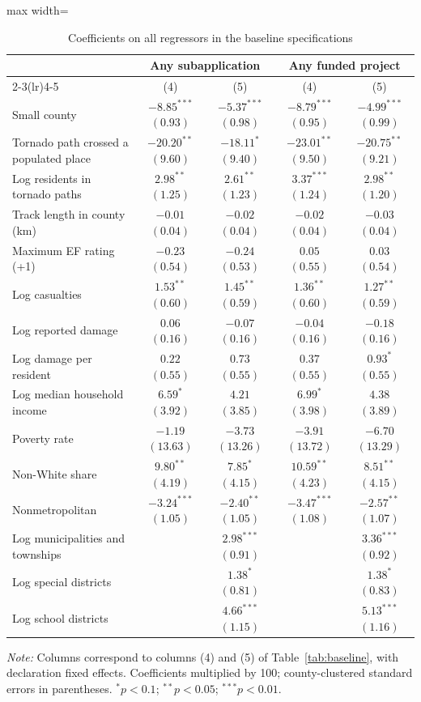\begin{table}[!htbp]
\centering
\caption{Coefficients on all regressors in the baseline specifications}
\label{tab:controls}
\scriptsize
\begin{adjustbox}{max width=\linewidth}
\begin{tabular}{@{}lcccc@{}}
\toprule
 & \multicolumn{2}{c}{Any subapplication} & \multicolumn{2}{c}{Any funded project} \\
\cmidrule(lr){2-3}\cmidrule(lr){4-5}
 & (4) & (5) & (4) & (5) \\
\midrule
Small county & $-8.85^{***}$ $(0.93)$ & $-5.37^{***}$ $(0.98)$ & $-8.79^{***}$ $(0.95)$ & $-4.99^{***}$ $(0.99)$ \\
Tornado path crossed a populated place & $-20.20^{**}$ $(9.60)$ & $-18.11^{*}$ $(9.40)$ & $-23.01^{**}$ $(9.50)$ & $-20.75^{**}$ $(9.21)$ \\
Log residents in tornado paths & $2.98^{**}$ $(1.25)$ & $2.61^{**}$ $(1.23)$ & $3.37^{***}$ $(1.24)$ & $2.98^{**}$ $(1.20)$ \\
Track length in county (km) & $-0.01$ $(0.04)$ & $-0.02$ $(0.04)$ & $-0.02$ $(0.04)$ & $-0.03$ $(0.04)$ \\
Maximum EF rating (+1) & $-0.23$ $(0.54)$ & $-0.24$ $(0.53)$ & $0.05$ $(0.55)$ & $0.03$ $(0.54)$ \\
Log casualties & $1.53^{**}$ $(0.60)$ & $1.45^{**}$ $(0.59)$ & $1.36^{**}$ $(0.60)$ & $1.27^{**}$ $(0.59)$ \\
Log reported damage & $0.06$ $(0.16)$ & $-0.07$ $(0.16)$ & $-0.04$ $(0.16)$ & $-0.18$ $(0.16)$ \\
Log damage per resident & $0.22$ $(0.55)$ & $0.73$ $(0.55)$ & $0.37$ $(0.55)$ & $0.93^{*}$ $(0.55)$ \\
Log median household income & $6.59^{*}$ $(3.92)$ & $4.21$ $(3.85)$ & $6.99^{*}$ $(3.98)$ & $4.38$ $(3.89)$ \\
Poverty rate & $-1.19$ $(13.63)$ & $-3.73$ $(13.26)$ & $-3.91$ $(13.72)$ & $-6.70$ $(13.29)$ \\
Non-White share & $9.80^{**}$ $(4.19)$ & $7.85^{*}$ $(4.15)$ & $10.59^{**}$ $(4.23)$ & $8.51^{**}$ $(4.15)$ \\
Nonmetropolitan & $-3.24^{***}$ $(1.05)$ & $-2.40^{**}$ $(1.05)$ & $-3.47^{***}$ $(1.08)$ & $-2.57^{**}$ $(1.07)$ \\
Log municipalities and townships &  & $2.98^{***}$ $(0.91)$ &  & $3.36^{***}$ $(0.92)$ \\
Log special districts &  & $1.38^{*}$ $(0.81)$ &  & $1.38^{*}$ $(0.83)$ \\
Log school districts &  & $4.66^{***}$ $(1.15)$ &  & $5.13^{***}$ $(1.16)$ \\
\bottomrule
\end{tabular}
\end{adjustbox}
\begin{minipage}{0.9\linewidth}\vspace{4pt}\scriptsize
\textit{Note:} Columns correspond to columns (4) and (5) of Table~\ref{tab:baseline}, with declaration fixed effects. Coefficients multiplied by 100; county-clustered standard errors in parentheses. $^{*}p<0.1$; $^{**}p<0.05$; $^{***}p<0.01$.
\end{minipage}
\end{table}
